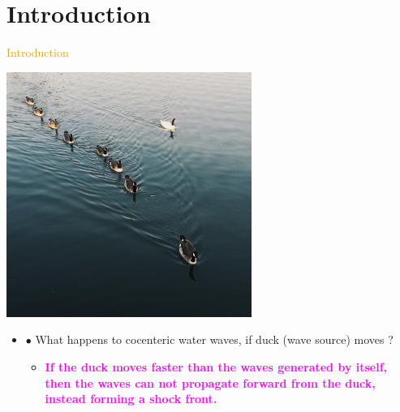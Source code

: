 \documentclass[11pt]{beamer} %
\renewcommand{\(}{\begin{columns}}
\renewcommand{\)}{\end{columns}}
\newcommand{\<}[1]{\begin{column}{#1}}
\renewcommand{\>}{\end{column}}
\newcommand{\itt}{\begin{itemize}}
\newcommand{\tti}{\end{itemize}}
\newcommand{\hlt}[2]{\textcolor{#1}{\textbf{#2}}}
\begin{document}


\section{Introduction} 
\begin{frame}{\textcolor{Goldenrod}{Introduction}}
  \begin{center}
  \includegraphics[width=0.6\textwidth,
  height=0.4\textheight]{./Images/little_duck_swim}\\
  \end{center}
  \itt
  \item[$\bullet$] What happens to cocenteric water waves, if duck
    (wave source) moves ?
    \itt
  \item \hlt{Magenta}{If the duck moves faster than the waves generated by itself,
    then the waves can not propagate forward from the duck, instead
    forming a shock front.}
    \tti
  \tti
\end{frame}
\end{document}
